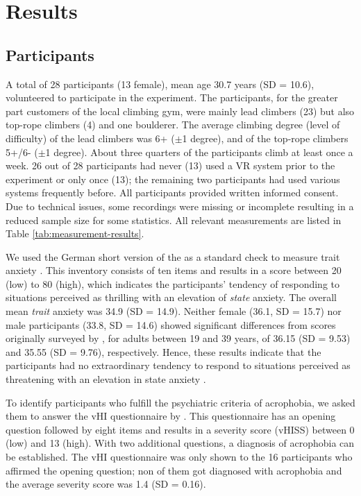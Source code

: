\section{Results}

\subsection{Participants}

A total of 28 participants (13 female), mean age 30.7 years (SD = 10.6), volunteered to participate in the experiment. The participants, for the greater part customers of the local climbing gym, were mainly lead climbers (23) but also top-rope climbers (4) and one boulderer. The average  climbing degree (level of difficulty) of the lead climbers was 6+ ($\pm$1 degree), and of the top-rope climbers 5+/6- ($\pm$1 degree). About three quarters of the participants climb at least once a week. 26 out of 28 participants had never (13) used a VR system prior to the experiment or only once (13); the remaining two participants had used various systems frequently before. All participants provided written informed consent. Due to technical issues, some recordings were missing or incomplete resulting in a reduced sample size for some statistics. All relevant measurements are listed in Table \vref{tab:measurement-results}.

We used the German short version of the  as a standard check to measure trait anxiety \autocites{Pijpers2006}{Grimm2009}[based on][]{Spielberger1970}. This inventory consists of ten items and results in a score between 20 (low) to 80 (high), which indicates the participants' tendency of responding to situations perceived as thrilling with an elevation of \textit{state} anxiety. The overall mean \textit{trait} anxiety was 34.9 (SD = 14.9). Neither female (36.1, SD = 15.7) nor male participants (33.8, SD = 14.6) showed significant differences from scores originally surveyed by \textcite{Spielberger1983}, for adults between 19 and 39 years, of 36.15 (SD = 9.53) and 35.55 (SD = 9.76), respectively. Hence, these results indicate that the participants had no extraordinary tendency to respond to situations perceived as threatening with an elevation in state anxiety \autocites{Pijpers2006}[based on][]{smith1998measurement}.

To identify participants who fulfill the psychiatric criteria of acrophobia, we asked them to answer the \gls{vHI} questionnaire by \textcite{Huppert2017}. This questionnaire has an opening question followed by eight items and results in a severity score (vHISS) between 0 (low) and 13 (high). With two additional questions, a diagnosis of acrophobia can be established. The \gls{vHI} questionnaire was only shown to the 16 participants who affirmed the opening question; non of them got diagnosed with acrophobia and the average severity score was 1.4 (SD = 0.16).

